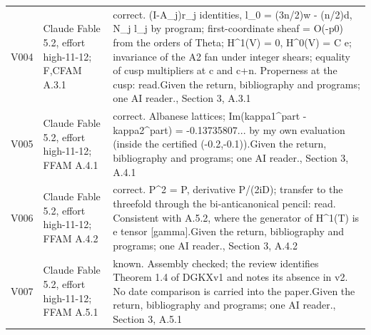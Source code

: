 \begin{longtable}{@{}L{.08\linewidth}L{.31\linewidth}L{.56\linewidth}@{}}
V004 & Claude Fable 5.2, effort high-11-12; F,C\newline FAM A.3.1 & correct. (I-A\_\allowbreak{}j)r\_\allowbreak{}j identities, l\_\allowbreak{}0 = (3n/\allowbreak{}2)w - (n/\allowbreak{}2)d, N\_\allowbreak{}j l\_\allowbreak{}j by program; first-coordinate sheaf = O(-p0) from the orders of Theta; H\textasciicircum{}1(V) = 0, H\textasciicircum{}0(V) = C e; invariance of the A2 fan under integer shears; equality of cusp multipliers at c and c+n. Properness at the cusp:\allowbreak{} read.\newline Given the return, bibliography and programs; one AI reader.\newline {}, Section 3, A.3.1\\
V005 & Claude Fable 5.2, effort high-11-12; F\newline FAM A.4.1 & correct. Albanese lattices; Im(kappa1\textasciicircum{}part - kappa2\textasciicircum{}part) = -0.13735807... by my own evaluation (inside the certified (-0.2,-0.1)).\newline Given the return, bibliography and programs; one AI reader.\newline {}, Section 3, A.4.1\\
V006 & Claude Fable 5.2, effort high-11-12; F\newline FAM A.4.2 & correct. P\textasciicircum{}2 = P, derivative P/\allowbreak{}(2iD); transfer to the threefold through the bi-anticanonical pencil:\allowbreak{} read. Consistent with A.5.2, where the generator of H\textasciicircum{}1(T) is e tensor [gamma].\newline Given the return, bibliography and programs; one AI reader.\newline {}, Section 3, A.4.2\\
V007 & Claude Fable 5.2, effort high-11-12; F\newline FAM A.5.1 & known. Assembly checked; the review identifies Theorem 1.4 of DGKXv1 and notes its absence in v2. No date comparison is carried into the paper.\newline Given the return, bibliography and programs; one AI reader.\newline {}, Section 3, A.5.1\\

\end{longtable}
